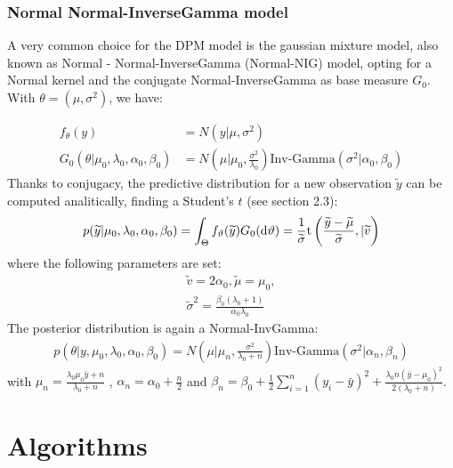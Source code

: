\subsubsection{Normal Normal-InverseGamma model} \label{nnig}
A very common choice for the DPM model is the gaussian mixture model, also known as Normal - Normal-InverseGamma (Normal-NIG) model, opting for a Normal kernel and the conjugate Normal-InverseGamma as base measure $G_0$. With $\theta=(\mu,\sigma^2)$, we have:

\begin{align}
            	f_\theta(y)&=N(y| \mu ,\sigma^2)  \\
            	G_0(\theta|\mu_0,\lambda_0, \alpha_0, \beta_0)&=N\left(\mu | \mu_0 ,\frac{\sigma^2} {\lambda_0}\right)\text{Inv-Gamma}(\sigma^2|\alpha_0, \beta_0 )
\end{align}
Thanks to conjugacy, the predictive distribution for a new observation $\widetilde{y}$ can be computed analitically, finding a Student's $t$ (see \cite{integral} section 2.3):
\begin{align}
      p(\widetilde{y}|\mu_0,\lambda_0, \alpha_0, \beta_0)= \int_\Theta f_\vartheta(\widetilde{y})G_0(\mathrm d\vartheta)= \frac{1}{\widetilde{\sigma}} \text{t}\left(\frac{\widetilde{y}-\widetilde{\mu}}{\widetilde{\sigma}} ,|\widetilde{v}\right)        	
\end{align}
where the following parameters are set:
\begin{align*}
	\widetilde{v}=2 \alpha_0, \widetilde{\mu}=\mu_0, \\
	\widetilde{\sigma}^2= \frac{\beta_0(\lambda_0+1)}{\alpha_0 \lambda_0}
\end{align*}
The posterior distribution is again a Normal-InvGamma:
\begin{align}
          p(\theta|y,\mu_0,\lambda_0, \alpha_0, \beta_0)=N\left(\mu | \mu_n ,\frac{\sigma^2} {\lambda_0 + n}\right)\text{Inv-Gamma}(\sigma^2|\alpha_n, \beta_n )
\end{align}
with $\mu_n=\frac{\lambda_0 \mu_0 \bar{y} + n}{\lambda_0 + n}$ , $\alpha_n= \alpha_0 + \frac{n}{2} $ and $\beta_n= \beta_0 + \frac{1}{2}\sum_{i=1}^{n} (y_i-\bar{y})^2 + \frac{\lambda_0 n(\bar{y}-\mu_0)^2}{2(\lambda_0 + n)}$.

\section{Algorithms}

